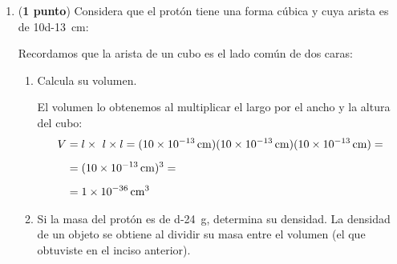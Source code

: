 \documentclass[14pt]{extarticle}
\begin{document}
\begin{enumerate}
\begin{enumerate}
Procedemos como se ha hecho en los dos ejercicios anteriores:
\begin{align*}
    \SI{1}{\centi\meter} &= \SI{10}{\milli\meter} \\
    (\SI{1}{\centi\meter})^{3} &= (\SI{10}{\milli\meter})^{3} \\
    \SI{1}{\cubic\centi\meter} &= \SI{d3}{\cubic\milli\meter}
\end{align*}
Por lo que tenemos ahora dos factores de conversión:
\begin{align*}
\SI{4}{\liter} \left( \dfrac{\SI{d3}{\cubic\centi\meter}}{\SI{1}{\liter}} \right) \left( \dfrac{\SI{d3}{\cubic\milli\meter}}{\SI{1}{\cubic\centi\meter}} \right) = \SI{4d6}{\cubic\milli\meter}
\end{align*}
\item Una masa de \SI{8}{\gram} en \unit{\kilo\gram}.
Este ejercicio es directo:
\begin{align*}
\SI{1}{\kilo\gram} = \SI{d3}{\gram}
\end{align*}
Ocupamos este factor de conversión:
\begin{align*}
\SI{8}{\gram} \left( \dfrac{\SI{1}{\kilo\gram}}{\SI{d3}{\gram}} \right) = \SI{8d-3}{\kilo\gram}
\end{align*}
\end{enumerate}
\item (\textbf{1 punto}) Considera que el protón tiene una forma cúbica y cuya arista es de \SI{10d-13}{\centi\meter}:

Recordamos que la arista de un cubo es el lado común de dos caras:
\begin{figure}[H]
\centering
{}
\end{figure}
\begin{enumerate}
\item Calcula su volumen.

El volumen lo obtenemos al multiplicar el largo por el ancho y la altura del cubo:
\begin{align*}
V &=  l \times\ l \times l = (\SI{10d-13}{\centi\meter})(\SI{10d-13}{\centi\meter})(\SI{10d-13}{\centi\meter}) = \\[0.5em]
&=(\SI{10d-13}{\centi\meter})^{3} = \\[0.5em]
&= \SI{1d-36}{\cubic\centi\meter}
\end{align*}
\item Si la masa del protón es de \SI{d-24}{\gram}, determina su densidad. La densidad de un objeto se obtiene al dividir su masa entre el volumen (el que obtuviste en el inciso anterior).


\end{enumerate}
\end{enumerate}
\end{document}
